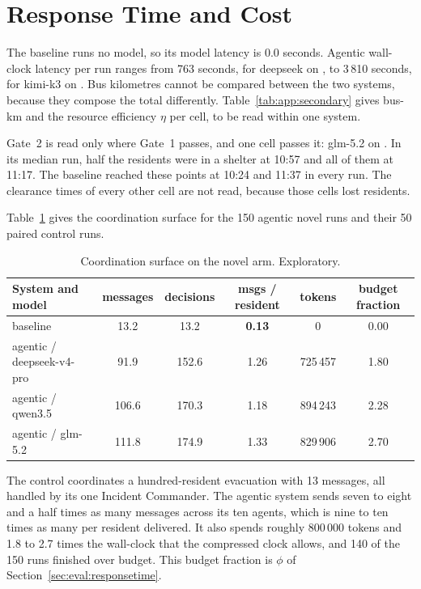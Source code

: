 \section{Response Time and Cost}
\label{sec:res:responsetime}

The baseline runs no model, so its model latency is 0.0 seconds. Agentic
wall-clock latency per run ranges from 763 seconds, for deepseek on
, to 3\,810 seconds, for kimi-k3 on
. Bus kilometres cannot be compared between
the two systems, because they compose the total differently.
Table~\ref{tab:app:secondary} gives bus-km
and the resource efficiency $\eta$ per cell, to be read within one system.

Gate~2 is read only where Gate~1 passes, and one cell passes it: glm-5.2 on
. In its median run, half the residents were in a shelter at
10:57 and all of them at 11:17. The baseline reached these points at 10:24 and
11:37 in every run. The clearance times of every other cell are not read, because
those cells lost residents.

Table~\ref{tab:res:surface} gives the coordination surface for the 150 agentic
novel runs and their 50 paired control runs.

\begin{table}[htbp]
\centering
\caption{Coordination surface on the novel arm. Exploratory.}
\label{tab:res:surface}
\footnotesize
\begin{tabular}{lccccc}
\toprule
System and model & messages & decisions & msgs / resident & tokens & budget fraction \\
\midrule
baseline & 13.2 & 13.2 & \textbf{0.13} & 0 & 0.00 \\
agentic / deepseek-v4-pro & 91.9 & 152.6 & 1.26 & 725\,457 & 1.80 \\
agentic / qwen3.5 & 106.6 & 170.3 & 1.18 & 894\,243 & 2.28 \\
agentic / glm-5.2 & 111.8 & 174.9 & 1.33 & 829\,906 & 2.70 \\
\bottomrule
\end{tabular}
\end{table}

The control coordinates a hundred-resident evacuation with 13 messages, all
handled by its one Incident Commander. The agentic system sends seven to eight
and a half times as many messages across its ten agents, which is nine to ten
times as many per resident delivered. It also spends roughly 800\,000 tokens
and 1.8 to 2.7 times the wall-clock that the compressed clock allows, and 140
of the 150 runs finished over budget. This budget fraction is $\phi$ of
Section~\ref{sec:eval:responsetime}.


